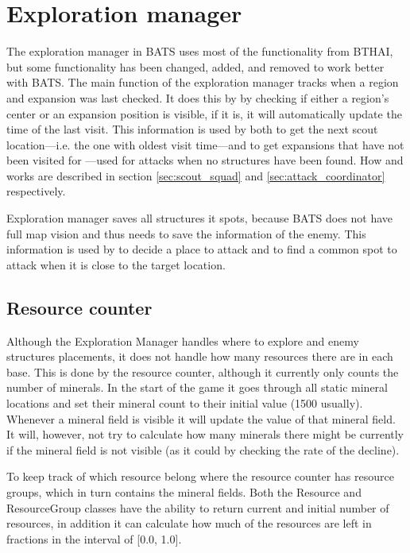 \section{Exploration manager}
\label{sec:exploration_manager}
The exploration manager in BATS uses most of the functionality from BTHAI, but some functionality has been changed, added, and removed to work better with BATS. The main function of the exploration manager tracks when a region and expansion was last checked. It does this by by checking if either a region’s center or an expansion position is visible, if it is, it will automatically update the time of the last visit. This information is used by both  to get the next scout location—i.e. the one with oldest visit time—and  to get expansions that have not been visited for \attackCoordinatorExpansionNotCheckedTime—used for attacks when no structures have been found. How  and  works are described in section \ref{sec:scout_squad} and \ref{sec:attack_coordinator} respectively.

Exploration manager saves all structures it spots, because BATS does not have full map vision and thus needs to save the information of the enemy. This information is used by  to decide a place to attack and  to find a common spot to attack when it is close to the target location.

\subsection{Resource counter}
\label{sec:resource_counter}
Although the Exploration Manager handles where to explore and enemy structures placements, it does not handle how many resources there are in each base. This is done by the resource counter, although it currently only counts the number of minerals. In the start of the game it goes through all static mineral locations and set their mineral count to their initial value (1500 usually). Whenever a mineral field is visible it will update the value of that mineral field. It will, however, not try to calculate how many minerals there might be currently if the mineral field is not visible (as it could by checking the rate of the decline).

To keep track of which resource belong where the resource counter has resource groups, which in turn contains the mineral fields. Both the Resource and ResourceGroup classes have the ability to return current and initial number of resources, in addition it can calculate how much of the resources are left in fractions in the interval of [0.0, 1.0].